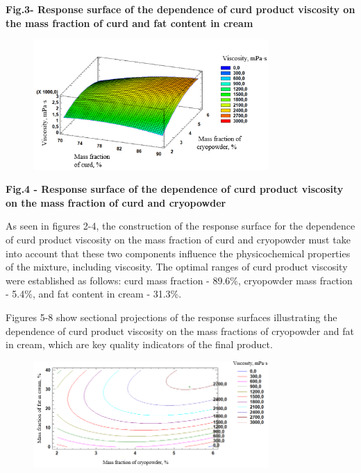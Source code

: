 {\bfseries Fig.3- Response surface of the dependence of curd product
viscosity on the mass fraction of curd and fat content in cream}


\begin{figure}[H]
	\centering
	\includegraphics[width=0.8\textwidth]{media/pish2/image84}
	\caption*{}
\end{figure}


{\bfseries Fig.4 - Response surface of the dependence of curd product
viscosity on the mass fraction of curd and cryopowder}

As seen in figures 2-4, the construction of the response surface for the
dependence of curd product viscosity on the mass fraction of curd and
cryopowder must take into account that these two components influence
the physicochemical properties of the mixture, including viscosity. The
optimal ranges of curd product viscosity were established as follows:
curd mass fraction - 89.6\%, cryopowder mass fraction - 5.4\%, and fat
content in cream - 31.3\%.

Figures 5-8 show sectional projections of the response surfaces
illustrating the dependence of curd product viscosity on the mass
fractions of cryopowder and fat in cream, which are key quality
indicators of the final product.


\begin{figure}[H]
	\centering
	\includegraphics[width=0.8\textwidth]{media/pish2/image85}
	\caption*{}
\end{figure}


